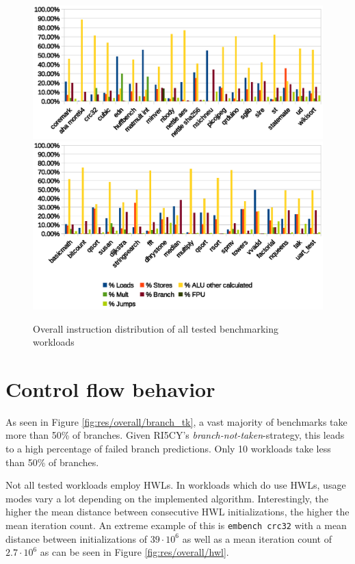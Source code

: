 \documentclass[../bachelor_paper.tex]{subfiles}
\begin{document}
\begin{figure}
    \centering
    \includegraphics[width=\textwidth]{img/graph/overall_inst_dist}
    \includegraphics[width=\textwidth]{img/graph/overall_inst_dist2}
    \caption{Overall instruction distribution of all tested benchmarking workloads}
    \label{fig:res/overall/inst}
\end{figure}

\section{Control flow behavior}
    \label{sec:res/control}
As seen in Figure \ref{fig:res/overall/branch_tk}, a vast majority of benchmarks take more than 50\% of branches. Given RI5CY's \emph{branch-not-taken}-strategy, this leads to a high percentage of failed branch predictions. Only 10 workloads take less than 50\% of branches.

Not all tested workloads employ \acp{HWL}. In workloads which do use \acp{HWL}, usage modes vary a lot depending on the implemented algorithm. Interestingly, the higher the mean distance between consecutive \ac{HWL} initializations, the higher the mean iteration count. An extreme example of this is \texttt{embench crc32} with a mean distance between initializations of $39 \cdot 10^6$ as well as a mean iteration count of $2.7 \cdot 10^6$ as can be seen in Figure \ref{fig:res/overall/hwl}. 
\end{document}
